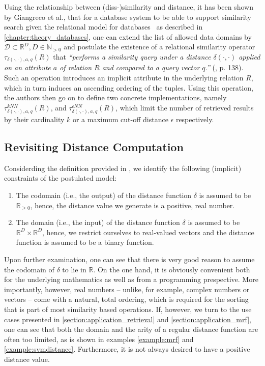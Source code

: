 Using the relationship between (diss-)similarity and distance, it has been shown by Giangreco et al., that for a database system to be able to support similarity search given the relational model for databases~\cite{Codd:1970Relational,Codd:1990Relational} as described in \cref{chapter:theory_databases}, one can extend the list of allowed data domains by $\mathcal{D} \subset \mathbb{R}^{D}, D \in \mathbb{N}_{>0}$ and postulate the existence of a relational similarity operator $\tau_{\delta(\cdot,\cdot),a,q}(R)$ that \emph{``performs a similarity query under a distance $\delta(\cdot,\cdot)$ applied on an attribute $a$ of relation $R$ and compared to a query vector $q$.''} (\cite{Giangreco:2018thesis}, p. 138). Such an operation introduces an implicit attribute in the underlying relation $R$, which in turn induces an ascending ordering of the tuples. Using this operation, the authors then go on to define two concrete implementations, namely $\tau^{kNN}_{\delta(\cdot,\cdot),a,q}(R)$, and $\tau^{\epsilon NN}_{\delta(\cdot,\cdot),a,q}(R)$, which limit the number of retrieved results by their cardinality $k$ or a maximum cut-off distance $\epsilon$ respectively.

\subsection{Revisiting Distance Computation}

Considerding the definition provided in , we identify the following (implicit) constraints of the postulated model:

\begin{enumerate}
    \item The codomain (i.e., the output) of the distance function $\delta$ is assumed to be $\mathbb{R}_{\geq 0}$, hence, the distance value we generate is a positive, real number.
    \item The domain (i.e., the input) of the distance function $\delta$ is assumed to be $\mathbb{R}^{D} \times \mathbb{R}^{D}$, hence, we restrict ourselves to real-valued vectors and the distance function is assumed to be a binary function.
\end{enumerate}

Upon further examination, one can see that there is very good reason to assume the codomain of $\delta$ to lie in $\mathbb{R}$. On the one hand, it is obviously convenient both for the underlying mathematics as well as from a programming prespective. More importantly, however, real numbers -- unlike, for example, complex numbers or vectors -- come with a natural, total ordering, which is required for the sorting that is part of most similarity based operations. If, however, we turn to the use cases presented in \cref{section:application_retrieval} and \cref{section:application_mrf}, one can see that both the domain and the arity of a regular distance function are often too limited, as is shown in examples \cref{example:mrf} and \cref{example:svmdistance}. Furthermore, it is not always desired to have a positive distance value.

